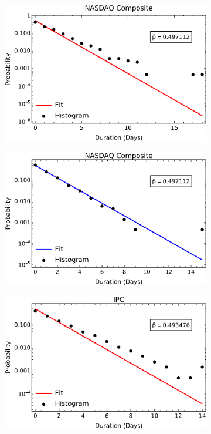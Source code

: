 \documentclass[a4paper]{jpconf}
\begin{document}
\begin{figure}[h!tb]
\begin{subfigure}[b]{0.45\textwidth}
            \includegraphics[width=\textwidth]{img/dist_pos_NASDAQ.eps}
            \caption[]{}      
        \end{subfigure}
        \quad
        \begin{subfigure}[b]{0.45\textwidth}   
            \centering 
            \includegraphics[width=\textwidth]{img/dist_neg_NASDAQ.eps}
            \caption[]{}      
        \end{subfigure}
        \begin{subfigure}[b]{0.45\textwidth}
            \centering
            \includegraphics[width=\textwidth]{img/dist_pos_IPC.eps}

\end{subfigure}
\end{figure}
\end{document}

